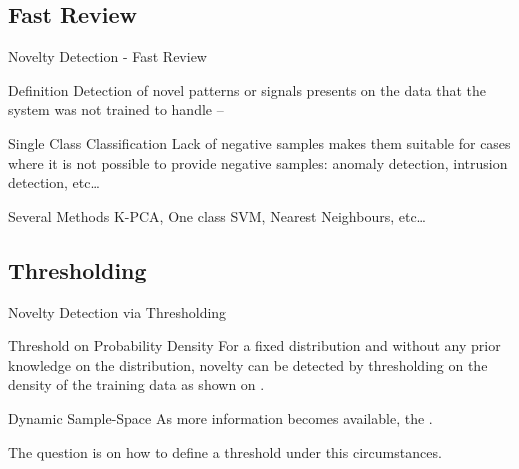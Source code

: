 \documentclass[compress]{beamer}
\begin{document}
\subsection{Fast Review}
\begin{frame}{Novelty Detection - Fast Review}
  \begin{block}{Definition}
    Detection of novel patterns or signals presents on the data that the system was not trained
    to handle -- \cite{markou2003novelty}
  \end{block}
  \begin{block}{Single Class Classification}
    Lack of negative samples makes them suitable for cases where it is not possible to
    provide negative samples: anomaly detection, intrusion detection, etc\dots
  \end{block}
  \begin{block}{Several Methods}
    K-PCA, One class SVM, Nearest Neighbours, etc\dots
  \end{block}
\end{frame}

\subsection{Thresholding}
\begin{frame}{Novelty Detection via Thresholding}

\begin{block}{Threshold on Probability Density}
For a fixed distribution and without any prior knowledge on the distribution,
novelty can be detected by thresholding on the density of
the training data as shown on \cite{bishop1994novelty}.
\end{block}

\begin{block}{Dynamic Sample-Space}
As more information becomes available, the .

The question is on how to define a threshold under this circumstances. 
\end{block}
\end{frame}
\end{document}

